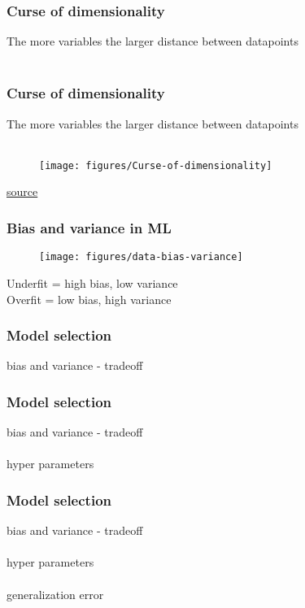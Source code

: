 \documentclass{beamer}
\begin{document}
\begin{frame}
	\frametitle{Curse of dimensionality}
	\begin{center}
		The more variables the larger distance between datapoints\\~\\
	\end{center}
\end{frame}

\begin{frame}
	\frametitle{Curse of dimensionality}
	\begin{center}
		The more variables the larger distance between datapoints\\~\\
		\begin{figure}
			\texttt{[image: figures/Curse-of-dimensionality]}
			\label{fig:dim-curse}
		\end{figure}
		\href{http://www.newsnshit.com/curse-of-dimensionality-interactive-demo/}
		{source}
	\end{center}
\end{frame}

\begin{frame}
	\frametitle{Bias and variance in ML}
	\begin{center}
		\begin{figure}
			\texttt{[image: figures/data-bias-variance]}
			\label{fig:bias-var}
		\end{figure}
		\medskip
		Underfit = high bias, low variance\\
		Overfit = low bias, high variance
	\end{center}
\end{frame}

\begin{frame}
	\frametitle{Model selection}
	\begin{center}
		bias and variance - tradeoff\\
	\end{center}
\end{frame}

\begin{frame}
	\frametitle{Model selection}
	\begin{center}
		bias and variance - tradeoff\\~\\
		hyper parameters
	\end{center}
\end{frame}

\begin{frame}
	\frametitle{Model selection}
	\begin{center}
		bias and variance - tradeoff\\~\\
		hyper parameters\\~\\
		generalization error
	\end{center}
\end{frame}
\end{document}
